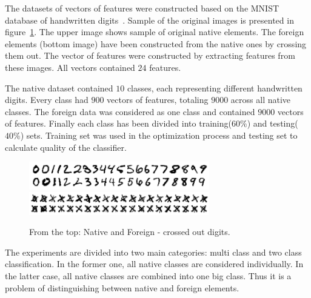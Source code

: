 \documentclass{mini}
\begin{document}





The datasets of vectors of features were constructed based on the MNIST database of handwritten digits~\cite{digits_db}. Sample of the original images is presented in figure~\ref{fig:native_foreign_png}. The upper image shows sample of original native elements. The foreign elements (bottom image) have been constructed from the native ones by crossing them out. The vector of features were constructed by extracting features from these images. All vectors contained $24$ features.

The native dataset contained $10$ classes, each representing different handwritten digits. Every class had $900$ vectors of features, totaling $9000$ across all native classes. The foreign data was considered as one class and contained $9000$ vectors of features. Finally each class has been divided into training($60\%$) and testing($40\%$) sets. Training set was used in the optimization process and testing set to calculate quality of the classifier.

\begin{figure}[H]
    \includegraphics[width=0.7\textwidth]{./images/native.png}
    \includegraphics[width=0.7\textwidth]{./images/crossedout.png}
    \caption{From the top: Native and Foreign - crossed out digits.}
    \label{fig:native_foreign_png}
\end{figure}

The experiments are divided into two main categories: multi class and two class classification. In the former one, all native classes are considered individually. In the latter case, all native classes are combined into one big class. Thus it is a problem of distinguishing between native and foreign elements.
\end{document}

